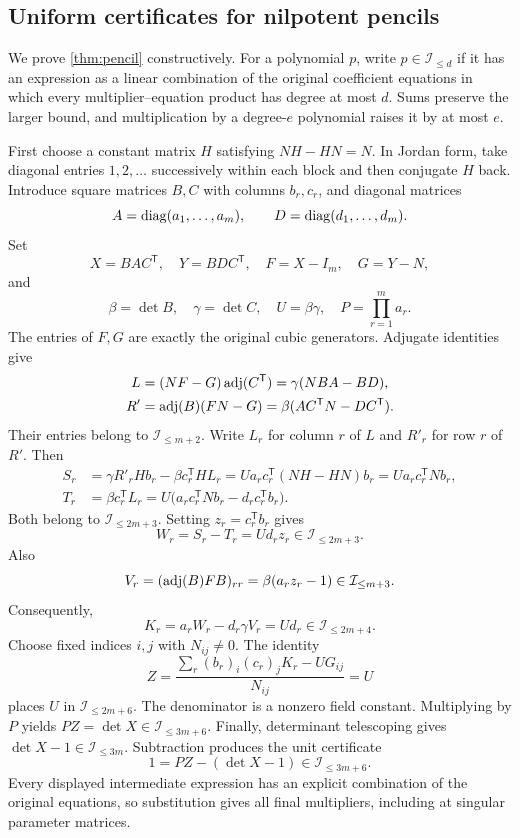 \subsection{Uniform certificates for nilpotent pencils}\label{app:pencil}

We prove \cref{thm:pencil} constructively. For a polynomial $p$, write $p\in\mathcal I_{\le d}$ if it has an expression as a linear combination of the original coefficient equations in which every multiplier--equation product has degree at most $d$. Sums preserve the larger bound, and multiplication by a degree-$e$ polynomial raises it by at most $e$.

First choose a constant matrix $H$ satisfying $NH-HN=N$. In Jordan form, take diagonal entries $1,2,\ldots$ successively within each block and then conjugate $H$ back. Introduce square matrices $B,C$ with columns $b_r,c_r$, and diagonal matrices
\[
 A=\operatorname{diag}(a_1,\ldots,a_m),\qquad D=\operatorname{diag}(d_1,\ldots,d_m).
\]
Set
\[
 X=BAC^{\mathsf T},\quad Y=BDC^{\mathsf T},\quad
 F=X-I_m,\quad G=Y-N,
\]
and
\[
 \beta=\det B,\quad \gamma=\det C,\quad U=\beta\gamma,
 \quad P=\prod_{r=1}^m a_r.
\]
The entries of $F,G$ are exactly the original cubic generators. Adjugate identities give
\begin{align*}
 L&=(NF-G)\operatorname{adj}(C^{\mathsf T})=\gamma(NBA-BD),\\
 R'&=\operatorname{adj}(B)(FN-G)=\beta(AC^{\mathsf T}N-DC^{\mathsf T}).
\end{align*}
Their entries belong to $\mathcal I_{\le m+2}$. Write $L_r$ for column $r$ of $L$ and $R'_r$ for row $r$ of $R'$. Then
\begin{align*}
 S_r&=\gamma R'_rHb_r-\beta c_r^{\mathsf T}HL_r
      =Ua_r c_r^{\mathsf T}(NH-HN)b_r
      =Ua_r c_r^{\mathsf T}Nb_r,\\
 T_r&=\beta c_r^{\mathsf T}L_r
      =U\bigl(a_r c_r^{\mathsf T}Nb_r-d_r c_r^{\mathsf T}b_r\bigr).
\end{align*}
Both belong to $\mathcal I_{\le2m+3}$. Setting $z_r=c_r^{\mathsf T}b_r$ gives
\[
 W_r=S_r-T_r=Ud_rz_r\in\mathcal I_{\le2m+3}.
\]
Also
\[
 V_r=(\operatorname{adj}(B)FB)_{rr}=\beta(a_rz_r-1)
       \in\mathcal I_{\le m+3}.
\]
Consequently,
\[
 K_r=a_rW_r-d_r\gamma V_r=Ud_r\in\mathcal I_{\le2m+4}.
\]
Choose fixed indices $i,j$ with $N_{ij}\ne0$. The identity
\[
 Z=\frac{\sum_r(b_r)_i(c_r)_jK_r-UG_{ij}}{N_{ij}}=U
\]
places $U$ in $\mathcal I_{\le2m+6}$. The denominator is a nonzero field constant. Multiplying by $P$ yields $PZ=\det X\in\mathcal I_{\le3m+6}$. Finally, determinant telescoping gives $\det X-1\in\mathcal I_{\le3m}$. Subtraction produces the unit certificate
\[
                      1=PZ-(\det X-1)\in\mathcal I_{\le3m+6}.
\]
Every displayed intermediate expression has an explicit combination of the original equations, so substitution gives all final multipliers, including at singular parameter matrices.

